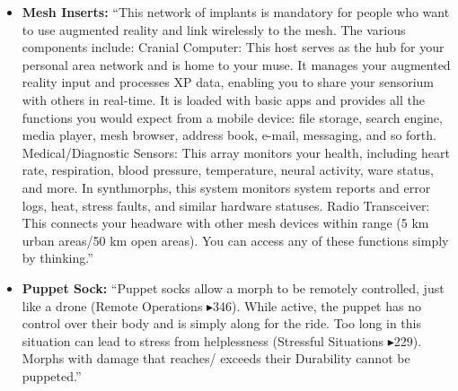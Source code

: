 \begin{itemize}
    \item \textbf{Mesh Inserts:} “This network of implants is mandatory for people who want to use augmented reality and link wirelessly to the mesh. The various components include: Cranial Computer: This host serves as the hub for your personal area network and is home to your muse. It manages your augmented reality input and processes XP data, enabling you to share your sensorium with others in real-time. It is loaded with basic apps and provides all the functions you would expect from a mobile device: file storage, search engine, media player, mesh browser, address book, e-mail, messaging, and so forth. Medical/Diagnostic Sensors: This array monitors your health, including heart rate, respiration, blood pressure, temperature, neural activity, ware status, and more. In synthmorphs, this system monitors system reports and error logs, heat, stress faults, and similar hardware statuses. Radio Transceiver: This connects your headware with other mesh devices within range (5 km urban areas/50 km open areas). You can access any of these functions simply by thinking.” \citep[pg. 316]{ep2e_1.1_2019}

    \item \textbf{Puppet Sock:} “Puppet socks allow a morph to be remotely controlled, just like a drone (Remote Operations $\blacktriangleright$346). While active, the puppet has no control over their body and is simply along for the ride. Too long in this situation can lead to stress from helplessness (Stressful Situations $\blacktriangleright$229). Morphs with damage that reaches/ exceeds their Durability cannot be puppeted.” \citep[pg. 316]{ep2e_1.1_2019}
\end{itemize}